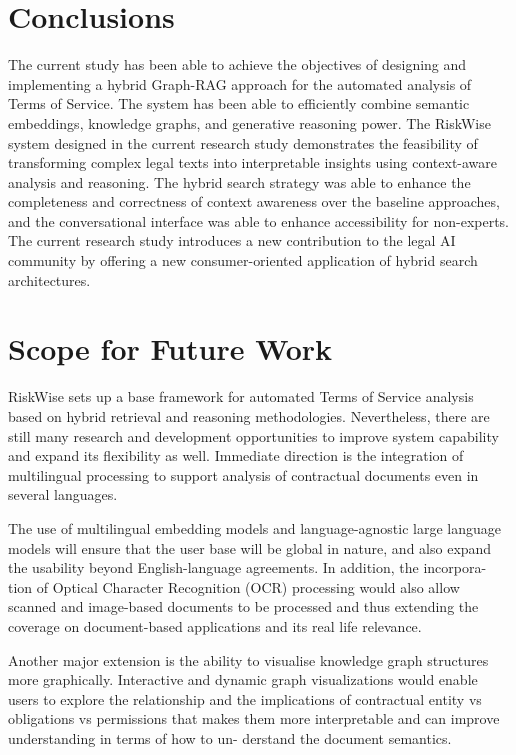 \section{Conclusions}
The current study has been able to achieve the objectives of
designing and implementing a hybrid Graph-RAG approach for the
automated analysis of Terms of Service. The system has been able to
efficiently combine semantic embeddings, knowledge graphs, and
generative reasoning power.
The RiskWise system designed in the current research study
demonstrates the feasibility of transforming complex legal texts into
interpretable insights using context-aware analysis and reasoning.
The hybrid search strategy was able to enhance the completeness and
correctness of context awareness over the baseline approaches, and
the conversational interface was able to enhance accessibility for non-experts.
The current research study introduces a new contribution to the legal
AI community by offering a new consumer-oriented application of
hybrid search architectures.

\section{Scope for Future Work}

RiskWise sets up a base framework for automated Terms of Service analysis based on hybrid retrieval and
reasoning methodologies.
Nevertheless, there are still many research and development opportunities to improve system capability and
expand its flexibility as well.
Immediate direction is the integration of multilingual processing to support analysis of contractual documents
even in several languages.

The use of multilingual embedding models and language-agnostic large language models will ensure that the
user base will be global in nature, and also expand the usability beyond English-language agreements.
In addition, the incorpora- tion of Optical Character Recognition (OCR) processing would also allow scanned
and image-based documents to be processed and thus extending the coverage on document-based applications
and its real life relevance.

Another major extension is the ability to visualise knowledge graph structures more graphically.
Interactive and dynamic graph visualizations would enable users to explore the relationship and the implications
of contractual entity vs obligations vs permissions that makes them more interpretable and can improve
understanding in terms of how to un- derstand the document semantics.

